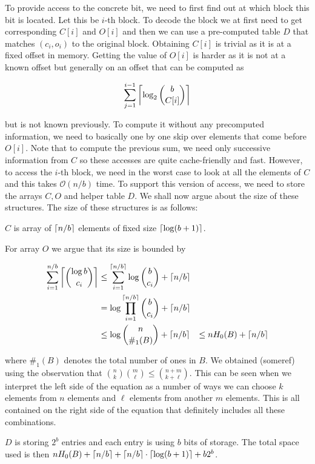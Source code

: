 To provide access to the concrete bit, we need to first find out at which block this bit is located.
Let this be $i$-th block. To decode the block we at first need to get corresponding $C[i]$ and
$O[i]$ and then we can use a pre-computed table $D$ that matches $(c_i, o_i)$ to the original
block. Obtaining $C[i]$ is trivial as it is at a fixed offset in memory. Getting the value of
$O[i]$ is harder as it is not at a known offset but generally on an offset that can be computed
as

                $$\sum_{j=1}^{i-1} \left\lceil \log_2{b\choose C[i]} \right\rceil$$

but is not known previously. To compute it without any precomputed information,
we need to basically one by one skip over elements that come before $O[i]$.
Note that to compute the previous sum, we need only successive information from $C$ so these
accesses are quite cache-friendly and fast. However, to access the $i$-th block, we need in the
worst case to look at all the elements of $C$ and this takes $\mathcal{O}(n/b)$ time. To support
this version of access, we need to store the arrays $C, O$ and helper table $D$. We shall
now argue about the size of these structures. The size of these structures is
as follows:

$C$ is array of $\left\lceil n/b \right\rceil$ elements of fixed size $\left\lceil \log(b+1) \right\rceil$.

For array $O$ we argue that its size is bounded by

\begin{align*}
    \sum_{i=1}^{n/b} \left\lceil {\log b\choose c_i} \right\rceil
    &\leq \sum_{i=1}^{\left\lceil n/b \right\rceil} \log {b\choose c_i} + \left\lceil n/b \right\rceil \\
    &= \log\prod_{i=1}^{\left\lceil n/b \right\rceil} {b\choose c_i} + \left\lceil n/b \right\rceil \\
    &\leq \log{n\choose \#_1(B)} + \left\lceil n/b \right\rceil &\leq nH_0(B) + \left\lceil n/b \right\rceil
\end{align*}

where $\#_1(B)$ denotes the total number of ones in $B$. We obtained (someref) using the
observation that ${n\choose k} {m\choose \ell} \leq {n+m\choose k+\ell}$. This can be seen
when we interpret the left side of the equation as a number of ways we can choose $k$ elements
from $n$ elements and $\ell$ elements from another $m$ elements. This is all contained on the
right side of the equation that definitely includes all these combinations.

$D$ is storing $2^b$ entries and each entry is using $b$ bits of storage.
The total space used is then $nH_0(B) + \left\lceil n/b \right\rceil + \left\lceil n/b \right\rceil \cdot \left\lceil \log(b+1) \right\rceil + b2^b$.

